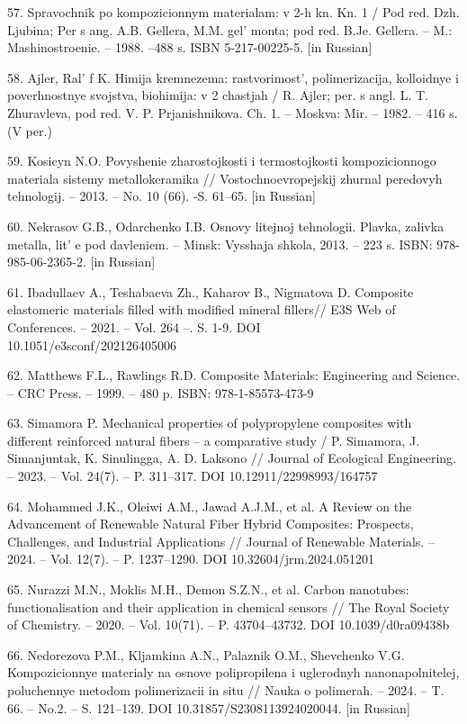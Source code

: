 \begin{references}
57. Spravochnik po kompozicionnym materialam: v 2-h kn. Kn. 1 / Pod red.
Dzh. Ljubina; Per s ang. A.B. Gellera, M.M. gel' monta;
pod red. B.Je. Gellera. -- M.: Mashinostroenie. -- 1988. --488 s. ISBN
5-217-00225-5. {[}in Russian{]}

58. Ajler, Ral' f K. Himija kremnezema:
rastvorimost', polimerizacija, kolloidnye i poverhnostnye
svojstva, biohimija: v 2 chastjah / R. Ajler; per. s angl. L. T.
Zhuravleva, pod red. V. P. Prjanishnikova. Ch. 1. -- Moskva: Mir. --
1982. -- 416 s. (V per.)

59. Kosicyn N.O. Povyshenie zharostojkosti i termostojkosti
kompozicionnogo materiala sistemy metallo\-keramika //
Vostochnoevropejskij zhurnal peredovyh tehnologij. -- 2013. -- No. 10
(66). -S. 61--65. {[}in Russian{]}

60. Nekrasov G.B., Odarchenko I.B. Osnovy litejnoj tehnologii. Plavka,
zalivka metalla, lit' e pod davleniem. -- Minsk: Vysshaja
shkola, 2013. -- 223 s. ISBN: 978-985-06-2365-2. {[}in Russian{]}

61. Ibadullaev A., Teshabaeva Zh., Kaharov B., Nigmatova D. Composite
elastomeric materials filled with modified mineral fillers// E3S Web of
Conferences. -- 2021. -- Vol. 264 --. S. 1-9. DOI\\
10.1051/e3sconf/202126405006

62. Matthews F.L., Rawlings R.D. Composite Materials: Engineering and
Science. -- CRC Press. -- 1999. -- 480 p. ISBN: 978-1-85573-473-9

63. Simamora P. Mechanical properties of polypropylene composites with
different reinforced natural fibers -- a comparative study / P.
Simamora, J. Simanjuntak, K. Sinulingga, A. D. Laksono // Journal of
Ecological Engineering. -- 2023. -- Vol. 24(7). -- P. 311--317. DOI
10.12911/22998993/164757

64. Mohammed J.K., Oleiwi A.M., Jawad A.J.M., et al. A Review on the
Advancement of Renewable Natural Fiber Hybrid Composites: Prospects,
Challenges, and Industrial Applications // Journal of Renew\-able
Materials. -- 2024. -- Vol. 12(7). -- P. 1237--1290. DOI
10.32604/jrm.2024.051201

65. Nurazzi M.N., Moklis M.H., Demon S.Z.N., et al. Carbon nanotubes:
functionalisation and their applic\-ation in chemical sensors // The Royal
Society of Chemistry. -- 2020. -- Vol. 10(71). -- P. 43704--43732. DOI
10.1039/d0ra09438b

66. Nedorezova P.M., Kljamkina A.N., Palaznik O.M., Shevchenko V.G.
Kompozicionnye materialy na osnove polipropilena i uglerodnyh
nanonapolnitelej, poluchennye metodom polimerizacii in situ // Nauka o
polimerah. -- 2024. -- T. 66. -- No.2. -- S. 121--139. DOI
10.31857/S2308113924020044. {[}in Russian{]}


\end{references}

